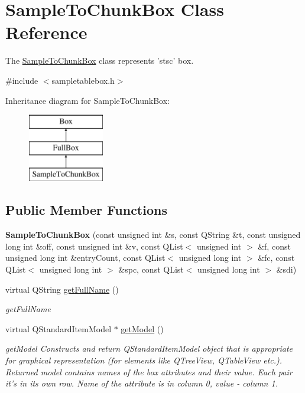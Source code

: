 \hypertarget{class_sample_to_chunk_box}{\section{Sample\-To\-Chunk\-Box Class Reference}
\label{class_sample_to_chunk_box}
}


The \hyperlink{class_sample_to_chunk_box}{Sample\-To\-Chunk\-Box} class represents 'stsc' box.  




{\ttfamily \#include $<$sampletablebox.\-h$>$}

Inheritance diagram for Sample\-To\-Chunk\-Box\-:\begin{figure}[H]
\begin{center}
\leavevmode
\includegraphics[height=3.000000cm]{class_sample_to_chunk_box}
\end{center}
\end{figure}
\subsection*{Public Member Functions}
\begin{DoxyCompactItemize}
\item 
\hypertarget{class_sample_to_chunk_box_af6fc855606e35ec7d8f6254f9068b28a}{{\bfseries Sample\-To\-Chunk\-Box} (const unsigned int \&s, const Q\-String \&t, const unsigned long int \&off, const unsigned int \&v, const Q\-List$<$ unsigned int $>$ \&f, const unsigned long int \&entry\-Count, const Q\-List$<$ unsigned long int $>$ \&fc, const Q\-List$<$ unsigned long int $>$ \&spc, const Q\-List$<$ unsigned long int $>$ \&sdi)}\label{class_sample_to_chunk_box_af6fc855606e35ec7d8f6254f9068b28a}

\item 
virtual Q\-String \hyperlink{class_sample_to_chunk_box_a298e53e6d563e66b7b910f99caeac0c3}{get\-Full\-Name} ()
\begin{DoxyCompactList}\small\item\em get\-Full\-Name \end{DoxyCompactList}\item 
virtual Q\-Standard\-Item\-Model $\ast$ \hyperlink{class_sample_to_chunk_box_a503e73d6fda55a6dcbbf4c2b035d6fb8}{get\-Model} ()
\begin{DoxyCompactList}\small\item\em get\-Model Constructs and return Q\-Standard\-Item\-Model object that is appropriate for graphical representation (for elements like Q\-Tree\-View, Q\-Table\-View etc.). Returned model contains names of the box attributes and their value. Each pair it's in its own row. Name of the attribute is in column 0, value -\/ column 1. \end{DoxyCompactList}\end{DoxyCompactItemize}
